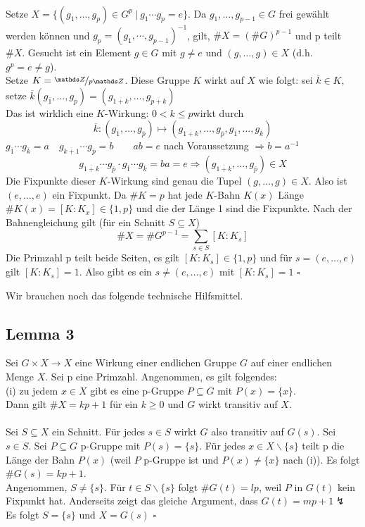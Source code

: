 \\
Setze $X=\{ (g_1,\dots,g_p)\in G^p~|~g_1\cdots g_p=e \}$. Da $g_1,\dots,g_{p-1}\in G$ frei gewählt werden können und $g_p=(g_1,\cdots,g_{p-1})^{-1}$, gilt, $\#X=(\#G)^{p-1}$ und p teilt $\#X$. Gesucht ist ein Element $g\in G$ mit $g\not= e$ und $(g,\dots,g)\in X$ (d.h. $g^p=e\not=g$).\\
Setze $K=\nicefrac{\Z}{p\Z}$. Diese Gruppe $K$ wirkt auf $X$ wie folgt: sei $\overline{k}\in K$, setze $\overline{k}(g_{\overline{1}},\dots,g_{\overline{p}})=(g_{\overline{1+k}},\dots,g_{\overline{p+k}})$\\
Das ist wirklich eine $K$-Wirkung: $0<k\le p$wirkt durch \[\overline{k}:(g_{\overline{1}},\dots,g_{\overline{p}}) \mapsto (g_{\overline{1+k}},\dots,g_{\overline{p}},g_{\overline{1}},\dots,g_{\overline{k}}) \] 
$g_{\overline{1}}\cdots g_{\overline{k}}=a\quad g_{\overline{k+1}}\cdots g_{\overline{p}}=b\qquad ab=e$ nach Voraussetzung $\Rightarrow b=a^{-1}$
\[g_{\overline{1+k}}\cdots g_{\overline{p}}\cdot g_{\overline{1}}\cdots g_{\overline{k}} =ba=e \Rightarrow (g_{\overline{1+k}},\dots,g_{\overline{p}})\in X \]
Die Fixpunkte dieser $K$-Wirkung sind genau die Tupel $(g,\dots,g)\in X$. Also ist $(e,\dots,e)$ ein Fixpunkt. Da $\#K=p$ hat jede $K$-Bahn $K(x)$ Länge $\#K(x)=[K:K_x]\in \{1,p\}$ und die der Länge 1 sind die Fixpunkte. Nach der Bahnengleichung gilt (für ein Schnitt $S\subseteq X$) \[\#X=\#G^{p-1}=\sum_{s\in S}[K:K_s] \]
Die Primzahl p teilt beide Seiten, es gilt $[K:K_s]\in \{1,p\}$ und für $s=(e,\dots,e)$ gilt $[K:K_s]=1$. Also gibt es ein $s\not=(e,\dots,e)$ mit $[K:K_s]=1$
\hfill $\square$
\newpage

Wir brauchen noch das folgende technische Hilfsmittel.

\subsection{Lemma 3}
\label{sub:lemma_3}
Sei $G\times X\to X$ eine Wirkung einer endlichen Gruppe $G$ auf einer endlichen Menge $X$. Sei p eine Primzahl. Angenommen, es gilt folgendes:\\
(i) zu jedem $x\in X$ gibt es eine p-Gruppe $P\subseteq G$ mit $P(x)=\{x\}$.\\
Dann gilt $\#X=kp+1$ für ein $k\ge0$ und $G$ wirkt transitiv auf $X$.\\

\\
Sei $S\subseteq X$ ein Schnitt. Für jedes $s\in S$ wirkt $G$ also transitiv auf $G(s)$. Sei $s\in S$. Sei $P\subseteq G$ p-Gruppe mit $P(s)=\{s\}$. Für jedes $x\in X\backslash\{s\}$ teilt p die Länge der Bahn $P(x)$ \big(weil $P$ p-Gruppe ist und $P(x)\not=\{x\}$ nach (i)\big). Es folgt $\#G(s)=kp+1$.\\
Angenommen, $S\not=\{s\}$. Für $t\in S\backslash\{s\}$ folgt $\#G(t)=lp$, weil $P$ in $G(t)$ kein Fixpunkt hat. Anderseits zeigt das gleiche Argument, dass $G(t)=mp+1\lightning$\\
Es folgt $S=\{s\}$ und $X=G(s)$
\hfill $\square$
\\

